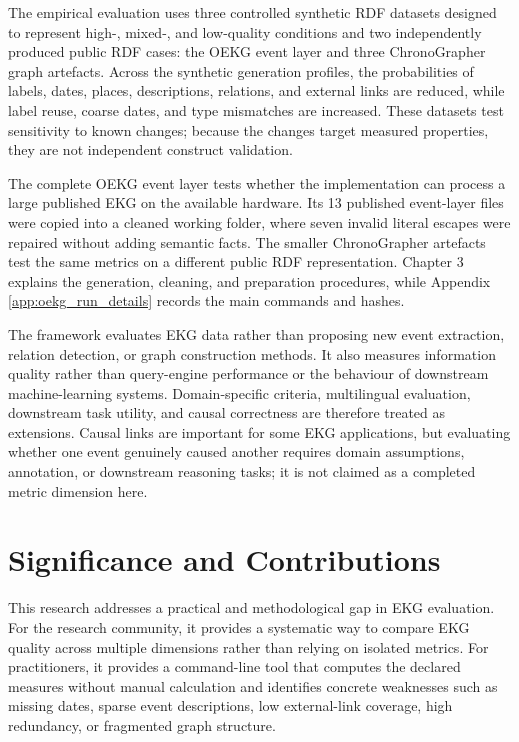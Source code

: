 The empirical evaluation uses three controlled synthetic RDF datasets designed to represent high-, mixed-, and low-quality conditions and two independently produced public RDF cases: the OEKG event layer and three ChronoGrapher graph artefacts. Across the synthetic generation profiles, the probabilities of labels, dates, places, descriptions, relations, and external links are reduced, while label reuse, coarse dates, and type mismatches are increased. These datasets test sensitivity to known changes; because the changes target measured properties, they are not independent construct validation.

The complete OEKG event layer tests whether the implementation can process a large published EKG on the available hardware. Its 13 published event-layer files were copied into a cleaned working folder, where seven invalid literal escapes were repaired without adding semantic facts. The smaller ChronoGrapher artefacts test the same metrics on a different public RDF representation. Chapter 3 explains the generation, cleaning, and preparation procedures, while Appendix \ref{app:oekg_run_details} records the main commands and hashes.

The framework evaluates EKG data rather than proposing new event extraction, relation detection, or graph construction methods. It also measures information quality rather than query-engine performance or the behaviour of downstream machine-learning systems. Domain-specific criteria, multilingual evaluation, downstream task utility, and causal correctness are therefore treated as extensions. Causal links are important for some EKG applications, but evaluating whether one event genuinely caused another requires domain assumptions, annotation, or downstream reasoning tasks; it is not claimed as a completed metric dimension here.

\section{Significance and Contributions}

This research addresses a practical and methodological gap in EKG evaluation. For the research community, it provides a systematic way to compare EKG quality across multiple dimensions rather than relying on isolated metrics. For practitioners, it provides a command-line tool that computes the declared measures without manual calculation and identifies concrete weaknesses such as missing dates, sparse event descriptions, low external-link coverage, high redundancy, or fragmented graph structure.

